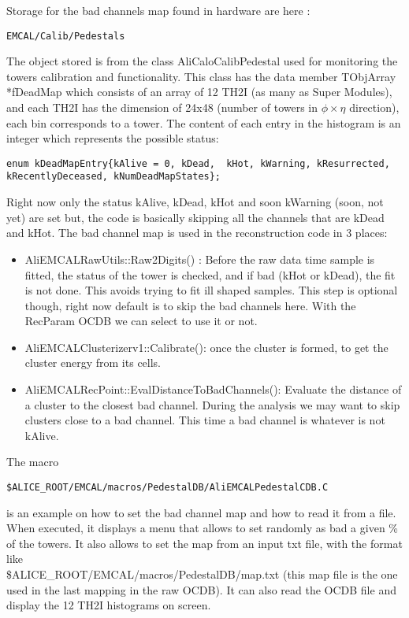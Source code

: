 Storage for the bad channels map found in hardware are here :
\begin{lstlisting}
EMCAL/Calib/Pedestals
\end{lstlisting}
The object stored is from the class AliCaloCalibPedestal used for monitoring the towers calibration and functionality. This class has the data member TObjArray *fDeadMap  which consists of an array of 12 TH2I (as many as Super Modules), and each TH2I has the dimension of 24x48 (number of towers in $\phi\times\eta$ direction), each bin corresponds to a tower. The content of each entry in the histogram is an integer which represents the possible status:
\begin{lstlisting}
enum kDeadMapEntry{kAlive = 0, kDead,  kHot, kWarning, kResurrected, kRecentlyDeceased, kNumDeadMapStates};
\end{lstlisting}
Right now only the status kAlive, kDead, kHot and soon kWarning (soon, not yet) are set but, the code is basically skipping all the channels that are  kDead and kHot. The bad channel map is used in the reconstruction code in 3 places:
\begin{itemize}
\item AliEMCALRawUtils::Raw2Digits() : Before the raw data time sample is fitted, the status of the tower is checked, and if bad (kHot or kDead), the fit is not done. This avoids trying to fit ill shaped samples. This step is optional though, right now default is to skip the bad channels here. With the RecParam OCDB we can select to use it or not.
\item AliEMCALClusterizerv1::Calibrate(): once the cluster is formed, to get the cluster energy from its cells.
\item AliEMCALRecPoint::EvalDistanceToBadChannels(): Evaluate the distance of a cluster to the closest bad channel. During the analysis we may want to skip clusters close to a bad channel. This time a bad channel is whatever is not kAlive.
\end{itemize}

The macro 
\begin{lstlisting}
$ALICE_ROOT/EMCAL/macros/PedestalDB/AliEMCALPedestalCDB.C
\end{lstlisting}
is an example on how to set the bad channel map and how to read it from a file. When executed, it displays a menu that allows to set randomly as bad a given \% of the towers. It also allows to set the map from an input txt file, with the format like\\ \$ALICE\_ROOT/EMCAL/macros/PedestalDB/map.txt (this map file is the one used in the last mapping in the raw OCDB). It can also read the OCDB file and display the 12 TH2I histograms on screen.

